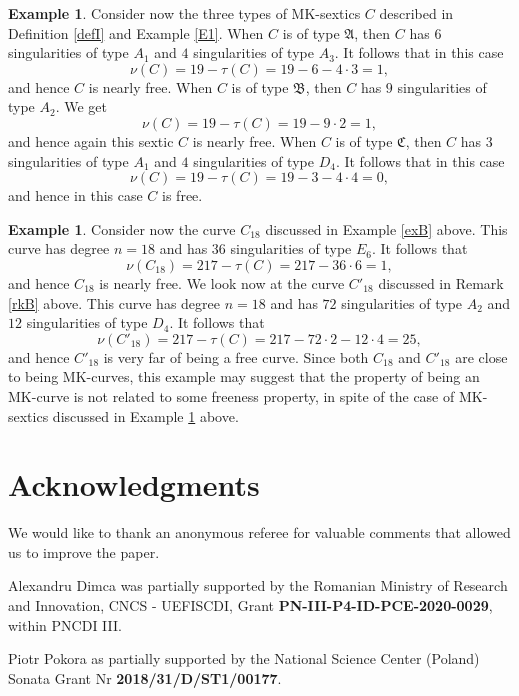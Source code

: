 \documentclass[11pt]{amsart}
\theoremstyle{plain}
\theoremstyle{definition}
\newtheorem{example}[thm]{Example}
\numberwithin{equation}{section}
\begin{document}
\begin{example}
\label{exNU}
Consider now the three types of MK-sextics $C$ described in Definition \ref{defI} and Example \ref{E1}. When $C$ is of type $\mathfrak{A}$, then $C$ has $6$ singularities of type $A_{1}$ and $4$ singularities of type $A_3$. It follows that in this case
$$\nu(C)= 19-\tau(C)=19-6-4\cdot 3=1,$$
and hence $C$ is nearly free. When $C$ is of type $\mathfrak{B}$, then $C$ has $9$ singularities of type $A_2$. We get
$$\nu(C)= 19-\tau(C)=19-9 \cdot 2=1,$$
and hence again this sextic $C$ is nearly free. When $C$ is of type $\mathfrak{C}$, then $C$ has $3$ singularities of type $A_{1}$ and $4$ singularities of type $D_{4}$. It follows that in this case
$$\nu(C)= 19-\tau(C)=19-3-4\cdot 4=0,$$
and hence in this case $C$ is free.
\end{example}

\begin{example}
\label{exNU2}
Consider now the curve $C_{18}$ discussed in Example \ref{exB} above.
This curve has degree $n=18$ and has $36$ singularities of type $E_{6}$. It follows that
$$\nu(C_{18})= 217-\tau(C)=217-36 \cdot 6=1,$$
and hence $C_{18}$ is nearly free. We look now at the curve $C'_{18}$ discussed in Remark \ref{rkB} above.
This curve has degree $n=18$ and has $72$ singularities of type $A_2$ and $12$ singularities of type $D_4$. It follows that
$$\nu(C'_{18})= 217-\tau(C)=217-72 \cdot 2 - 12 \cdot 4=25,$$
and hence $C'_{18}$ is very far of being a free curve. Since both $C_{18}$ and $C'_{18}$ are close to being MK-curves, this example may suggest that the property of being an MK-curve is not related to some freeness property, in spite of the case of MK-sextics discussed in Example \ref{exNU} above.
\end{example}

\section*{Acknowledgments}
We would like to thank an anonymous referee for valuable comments that allowed us to improve the paper. 

Alexandru Dimca was partially supported by the Romanian Ministry of Research and Innovation, CNCS - UEFISCDI, Grant \textbf{PN-III-P4-ID-PCE-2020-0029}, within PNCDI III.

Piotr Pokora as partially supported by the National Science Center (Poland) Sonata Grant Nr \textbf{2018/31/D/ST1/00177}.
\end{document}
